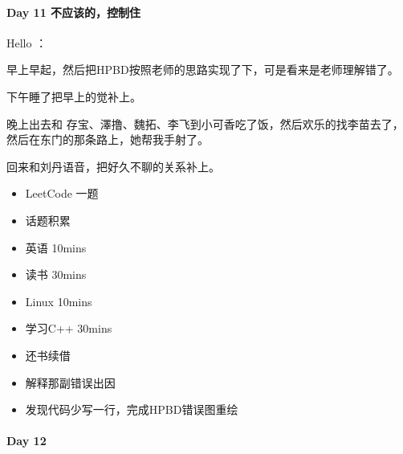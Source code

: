 \documentclass[UTF8,a4paper,8pt]{ctexbook}
\begin{document}
 	 \paragraph{Day 11  不应该的，控制住    \quad     }
			 	 Hello ：
			 	 
			 	 早上早起，然后把HPBD按照老师的思路实现了下，可是看来是老师理解错了。
			 	 
			 	 下午睡了把早上的觉补上。
			 	 
			 	 晚上出去和 存宝、澤撸、魏拓、李飞到小可香吃了饭，然后欢乐的找李苗去了，然后在东门的那条路上，她帮我手射了。
			 	 
			 	 回来和刘丹语音，把好久不聊的关系补上。
			 	 \begin{itemize}
			 	 	\item  LeetCode 一题			 	 	
			 	 	\item  话题积累 \makebox[0pt][l]{$\square$}\raisebox{.15ex}{\hspace{0.1em}$\checkmark$}
			 	 	\item  英语 10mins 	
			 	 	\item  读书 30mins	
			 	 	\item  Linux 10mins	  \makebox[0pt][l]{$\square$}\raisebox{.15ex}{\hspace{0.1em}$\checkmark$}
			 	 	\item  学习C++ 30mins  \makebox[0pt][l]{$\square$}\raisebox{.15ex}{\hspace{0.1em}$\checkmark$}
			 	 	\item  还书续借 \makebox[0pt][l]{$\square$}\raisebox{.15ex}{\hspace{0.1em}$\checkmark$}
			 	 	\item  解释那副错误出因 \makebox[0pt][l]{$\square$}\raisebox{.15ex}{\hspace{0.1em}$\checkmark$}
			 	 	\item  发现代码少写一行，完成HPBD错误图重绘 \makebox[0pt][l]{$\square$}\raisebox{.15ex}{\hspace{0.1em}$\checkmark$}
			 	 \end{itemize}
 	 \paragraph{Day 12      \quad     }
		 	 
\end{document}
